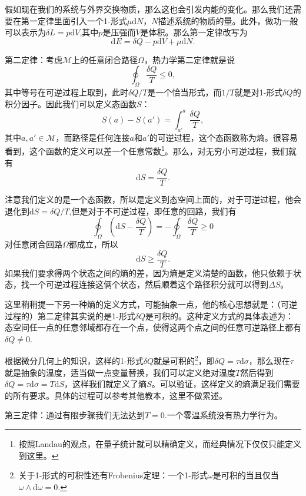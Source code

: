 \documentclass[10pt]{book}
\theoremstyle{plain}%
\begin{document}
假如现在我们的系统与外界交换物质，那么这也会引发内能的变化。那么我们还需要在第一定律里面引入一个1-形式$\mu \mathrm{d}N$，$N$描述系统的物质的量。此外，做功一般可以表示为$\delta L=p\mathrm{d}V$,其中$p$是压强而$V$是体积。那么第一定律改写为
\begin{equation}
\label{first}
\mathrm{d}E=\delta Q-p\mathrm{d}V+\mu \mathrm{d}N.
\end{equation}

{\kaishu 第二定律}：考虑$\mathcal{M}$上的任意闭合路径$\Omega$，热力学第二定律就是说
\[
\oint_{\Omega}\frac{\delta Q}{T}\leq 0,
\]
其中等号在可逆过程上取到，此时$\delta Q/T$是一个恰当形式，而$1/T$就是对1-形式$\delta Q$的积分因子。因此我们可以定义态函数$S$：
\[
S(a)-S(a')=\int_{a'}^a \frac{\delta Q}{T},
\]
其中$a,a'\in \mathcal{M}$，而路径是任何连接$a$和$a'$的可逆过程，这个态函数称为熵。很容易看到，这个函数的定义可以差一个任意常数\footnote{按照Landau的观点，在量子统计就可以精确定义，而经典情况下仅仅只能定义到这里。}。那么，对无穷小可逆过程，我们就有
\[
\mathrm{d}S=\frac{\delta Q}{T}.
\]

注意我们定义的是一个态函数，所以是定义到态空间上面的，对于可逆过程，他会退化到$\mathrm{d}S=\delta Q/T$,但是对于不可逆过程，即任意的回路，我们有
\[
\oint_{\Omega}\left(\mathrm{d}S-\frac{\delta Q}{T}\right)=-\oint_{\Omega}\frac{\delta Q}{T}\geq 0
\]
对任意闭合回路$\Omega$都成立，所以
\begin{equation}
\label{second}
\mathrm{d}S \geq \frac{\delta Q}{T}.
\end{equation}
如果我们要求得两个状态之间的熵的差，因为熵是定义清楚的函数，他只依赖于状态，找一个可逆过程连接这俩个状态，然后顺着这个路径积分就可以得到$\Delta S$。

这里稍稍提一下另一种熵的定义方式，可能抽象一点，他的核心思想就是：（可逆过程的）第二定律其实说的是1-形式$\delta Q$是可积的。这种定义方式的具体表述为：态空间任一点的任意邻域都存在一个点，使得这两个点之间的任意可逆路径上都有$\delta Q \neq 0$.

根据微分几何上的知识，这样的1-形式$\delta Q$就是可积的\footnote{关于1-形式的可积性还有Frobenius定理：一个1-形式$\omega$是可积的当且仅当$\omega \wedge \mathrm{d}\omega = 0$.}，即$\delta Q=\tau\mathrm{d}\sigma$，那么现在$\tau$就是抽象的温度，适当做一点变量替换，我们可以定义绝对温度$T$然后得到$\delta Q=\tau\mathrm{d}\sigma=T\mathrm{d}S$，这样我们就定义了熵$S$。可以验证，这样定义的熵满足我们需要的所有要求。具体的过程可以参考其他教本，这里不做累述。

{\kaishu 第三定律}：通过有限步骤我们无法达到$T=0$.一个零温系统没有热力学行为。
\end{document}
